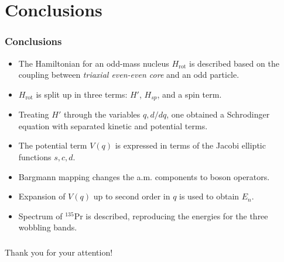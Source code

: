 \documentclass{beamer}
\begin{document}
\section{Conclusions}

\begin{frame}
  \frametitle{Conclusions}
  \begin{itemize}
    \item The Hamiltonian for an odd-mass nucleus $H_\text{rot}$ is described based on the coupling between \emph{triaxial even-even core} and an odd particle.
    \item $H_\text{rot}$ is split up in three terms: $H'$, $H_{sp}$, and a spin term.
    \item Treating $H'$ through the variables $q,d/dq$, one obtained a Schrodinger equation with separated kinetic and potential terms.
    \item The potential term $V(q)$ is expressed in terms of the Jacobi elliptic functions $s,c,d$.
    \item Bargmann mapping changes the a.m. components to boson operators.
    \item Expansion of $V(q)$ up to second order in $q$ is used to obtain $E_n$.
    \item Spectrum of $^{135}$Pr is described, reproducing the energies for the three wobbling bands.
  \end{itemize}
\end{frame}

\begin{frame}
  \frametitle{}
  \begin{center}
    {\Huge Thank you for your attention!}
  \end{center}
\end{frame}
\end{document}

